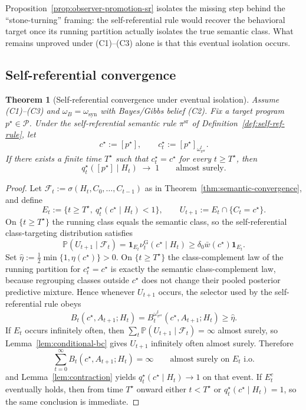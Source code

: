 \documentclass[11pt]{article}
\newtheorem{theorem}{Theorem}[section]
\theoremstyle{definition}
\theoremstyle{remark}
\newcommand{\Pcal}{\mathcal{P}}
\newcommand{\Prob}{\mathbb{P}}
\newcommand{\one}{\mathbf{1}}
\begin{document}
Proposition~\ref{prop:observer-promotion-sr} isolates the missing step behind the ``stone-turning'' framing: the self-referential rule would recover the behavioral target once its running partition actually isolates the true semantic class. What remains unproved under \textup{(C1)--(C3)} alone is that this eventual isolation occurs.

\subsection{Self-referential convergence}
\label{sec:self-ref-convergence}

\begin{theorem}[Self-referential convergence under eventual isolation]
\label{thm:self-ref-convergence}
Assume \textup{(C1)--(C3)} and $\omega_B=\omega_{\mathrm{syn}}$ with Bayes/Gibbs belief \textup{(C2)}. Fix a target program $p^\star\in\Pcal$. Under the self-referential semantic rule $\pi^{\mathrm{sr}}$ of Definition~\ref{def:self-ref-rule}, let
\[
c^\star:=[p^\star],
\qquad
c_t^\star:=[p^\star]_{\omega_{\pi^{\mathrm{sr}}}^t}.
\]
If there exists a finite time $T^\star$ such that $c_t^\star=c^\star$ for every $t\ge T^\star$, then
\[
q_t^\star([p^\star]\mid H_t)\;\longrightarrow\;1
\qquad\text{almost surely.}
\]
\end{theorem}

\begin{proof}
Let $\mathcal{F}_t:=\sigma(H_t,C_0,\dots,C_{t-1})$ as in Theorem~\ref{thm:semantic-convergence}, and define
\[
E_t:=\{t\ge T^\star,\ q_t^\star(c^\star\mid H_t)<1\},
\qquad
U_{t+1}:=E_t\cap\{C_t=c^\star\}.
\]
On $\{t\ge T^\star\}$ the running class equals the semantic class, so the self-referential class-targeting distribution satisfies
\[
\Prob(U_{t+1}\mid\mathcal{F}_t)
=
\one_{E_t}\nu_t^{\mathrm G}(c^\star\mid H_t)
\ge
\delta_0\bar w(c^\star)\one_{E_t}.
\]
Set $\hat\eta:=\tfrac{1}{2}\min\{1,\eta(c^\star)\}>0$. On $\{t\ge T^\star\}$ the class-complement law of the running partition for $c_t^\star=c^\star$ is exactly the semantic class-complement law, because regrouping classes outside $c^\star$ does not change their pooled posterior predictive mixture. Hence whenever $U_{t+1}$ occurs, the selector used by the self-referential rule obeys
\[
B_t(c^\star,A_{t+1};H_t)
=
B_t^{\omega_{\pi^{\mathrm{sr}}}^t}(c^\star,A_{t+1};H_t)
\ge
\hat\eta.
\]
If $E_t$ occurs infinitely often, then $\sum_t \Prob(U_{t+1}\mid\mathcal{F}_t)=\infty$ almost surely, so Lemma~\ref{lem:conditional-bc} gives $U_{t+1}$ infinitely often almost surely. Therefore
\[
\sum_{t=0}^{\infty}B_t(c^\star,A_{t+1};H_t)=\infty
\qquad\text{almost surely on }E_t\text{ i.o.}
\]
and Lemma~\ref{lem:contraction} yields $q_t^\star(c^\star\mid H_t)\to 1$ on that event. If $E_t^c$ eventually holds, then from time $T^\star$ onward either $t<T^\star$ or $q_t^\star(c^\star\mid H_t)=1$, so the same conclusion is immediate.
\end{proof}
\end{document}
